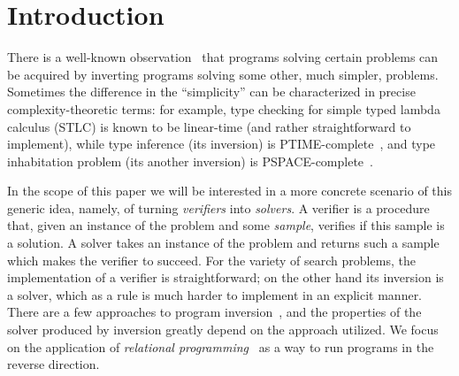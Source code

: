 \section{Introduction}


There is a well-known observation~\cite{lozov2019relational,SemanticsModifiers1} that programs solving certain problems can be acquired by inverting programs solving some other, much simpler, problems.
Sometimes the difference in the ``simplicity'' can be characterized in precise complexity-theoretic terms: for example, type checking for simple typed lambda calculus (STLC) is known to be linear-time (and rather straightforward to implement), while type inference (its inversion) is PTIME-complete~\cite{mairson2004linear}, and type inhabitation problem (its another inversion) is PSPACE-complete~\cite{urzyczyn1997inhabitation}.

In the scope of this paper we will be interested in a more concrete scenario of this generic idea, namely, of turning \emph{verifiers} into \emph{solvers}.
A verifier is a procedure that, given an instance of the problem and some \emph{sample}, verifies if this sample is a solution.
A solver takes an instance of the problem and returns such a sample which makes the verifier to succeed.
For the variety of search problems, the implementation of a verifier is straightforward; on the other hand its inversion is a solver, which as a rule is much harder to implement in an explicit manner.
There are a few approaches to program inversion~\cite{RevURA,aman2020foundations}, and the properties of the solver produced by inversion greatly depend on the approach utilized.
We focus on the application of \emph{relational programming}~\cite{TheReasonedSchemer} as a way to run programs in the reverse direction.



